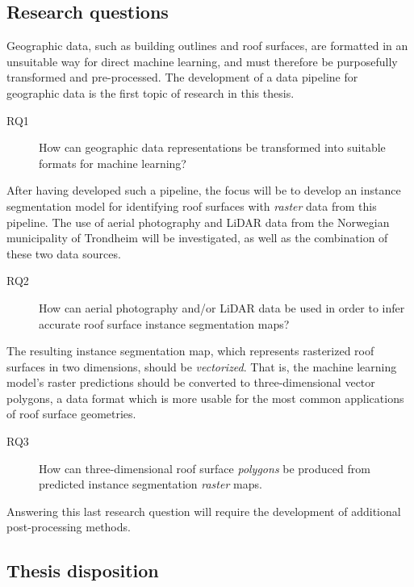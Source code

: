 \subsection*{Research questions}

Geographic data, such as building outlines and roof surfaces, are formatted in an unsuitable way for direct machine learning, and must therefore be purposefully transformed and pre-processed.
The development of a data pipeline for geographic data is the first topic of research in this thesis.
%
\begin{description}
  \item[RQ1] How can geographic data representations be transformed into suitable formats for machine learning?
\end{description}
%
After having developed such a pipeline, the focus will be to develop an instance segmentation model for identifying roof surfaces with \emph{raster} data from this pipeline.
The use of aerial photography and LiDAR data from the Norwegian municipality of Trondheim will be investigated, as well as the combination of these two data sources.
%
\begin{description}
  \item[RQ2] How can aerial photography and/or LiDAR data be used in order to infer accurate roof surface instance segmentation maps?
\end{description}
%
The resulting instance segmentation map, which represents rasterized roof surfaces in two dimensions, should be \emph{vectorized}.
That is, the machine learning model's raster predictions should be converted to three-dimensional vector polygons, a data format which is more usable for the most common applications of roof surface geometries.
%
\begin{description}
  \item[RQ3] How can three-dimensional roof surface \emph{polygons} be produced from predicted instance segmentation \emph{raster} maps.
\end{description}
%
Answering this last research question will require the development of additional post-processing methods.

\subsection*{Thesis disposition}
